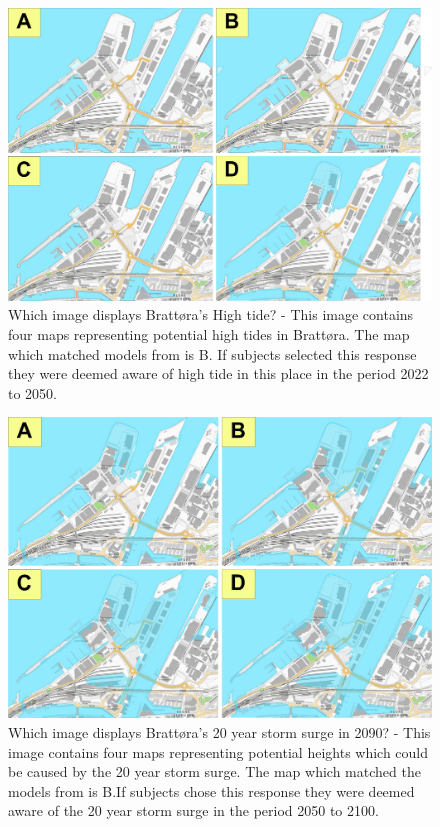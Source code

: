 \begin{figure} [h!]
    \centering
    \includegraphics[width=16cm]{fig/brattora question on 2022 high tide quadrant.png}
    \caption{Which image displays Brattøra's High tide? -  This image contains four maps representing potential high tides in Brattøra. The map which matched models from \cite{kartverket_se_2021} is B. If subjects selected this response they were deemed aware of high tide in this place in the period 2022 to 2050. }
    \label{fig:Brattora_2022_hightide}
\end{figure}

\begin{figure}[h!]
    \centering
    \includegraphics[width=16cm]{fig/brattora question on 2090 20 yr storm surge quadrant.png} 
    \caption{Which image displays Brattøra's 20 year storm surge in 2090? - This image contains four maps representing potential heights which could be caused by the 20 year storm surge. The map which matched the models from \cite{kartverket_se_2021} is B.If subjects chose this response they were deemed aware of the 20 year storm surge in the period 2050 to 2100. }
    \label{fig:brattora_2090_stormsurge}
\end{figure}

